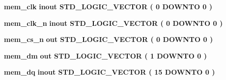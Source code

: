 \begin{DoxyCompactItemize}
\item 
{\bf mem\+\_\+clk}  {\bfseries {\bfseries \textcolor{keywordflow}{inout}\textcolor{vhdlchar}{ }}} {\bfseries \textcolor{comment}{S\+T\+D\+\_\+\+L\+O\+G\+I\+C\+\_\+\+V\+E\+C\+T\+OR}\textcolor{vhdlchar}{ }\textcolor{vhdlchar}{(}\textcolor{vhdlchar}{ }\textcolor{vhdlchar}{ } \textcolor{vhdldigit}{0} \textcolor{vhdlchar}{ }\textcolor{keywordflow}{D\+O\+W\+N\+TO}\textcolor{vhdlchar}{ }\textcolor{vhdlchar}{ } \textcolor{vhdldigit}{0} \textcolor{vhdlchar}{ }\textcolor{vhdlchar}{)}\textcolor{vhdlchar}{ }} 
\item 
{\bf mem\+\_\+clk\+\_\+n}  {\bfseries {\bfseries \textcolor{keywordflow}{inout}\textcolor{vhdlchar}{ }}} {\bfseries \textcolor{comment}{S\+T\+D\+\_\+\+L\+O\+G\+I\+C\+\_\+\+V\+E\+C\+T\+OR}\textcolor{vhdlchar}{ }\textcolor{vhdlchar}{(}\textcolor{vhdlchar}{ }\textcolor{vhdlchar}{ } \textcolor{vhdldigit}{0} \textcolor{vhdlchar}{ }\textcolor{keywordflow}{D\+O\+W\+N\+TO}\textcolor{vhdlchar}{ }\textcolor{vhdlchar}{ } \textcolor{vhdldigit}{0} \textcolor{vhdlchar}{ }\textcolor{vhdlchar}{)}\textcolor{vhdlchar}{ }} 
\item 
{\bf mem\+\_\+cs\+\_\+n}  {\bfseries {\bfseries \textcolor{keywordflow}{out}\textcolor{vhdlchar}{ }}} {\bfseries \textcolor{comment}{S\+T\+D\+\_\+\+L\+O\+G\+I\+C\+\_\+\+V\+E\+C\+T\+OR}\textcolor{vhdlchar}{ }\textcolor{vhdlchar}{(}\textcolor{vhdlchar}{ }\textcolor{vhdlchar}{ } \textcolor{vhdldigit}{0} \textcolor{vhdlchar}{ }\textcolor{keywordflow}{D\+O\+W\+N\+TO}\textcolor{vhdlchar}{ }\textcolor{vhdlchar}{ } \textcolor{vhdldigit}{0} \textcolor{vhdlchar}{ }\textcolor{vhdlchar}{)}\textcolor{vhdlchar}{ }} 
\item 
{\bf mem\+\_\+dm}  {\bfseries {\bfseries \textcolor{keywordflow}{out}\textcolor{vhdlchar}{ }}} {\bfseries \textcolor{comment}{S\+T\+D\+\_\+\+L\+O\+G\+I\+C\+\_\+\+V\+E\+C\+T\+OR}\textcolor{vhdlchar}{ }\textcolor{vhdlchar}{(}\textcolor{vhdlchar}{ }\textcolor{vhdlchar}{ } \textcolor{vhdldigit}{1} \textcolor{vhdlchar}{ }\textcolor{keywordflow}{D\+O\+W\+N\+TO}\textcolor{vhdlchar}{ }\textcolor{vhdlchar}{ } \textcolor{vhdldigit}{0} \textcolor{vhdlchar}{ }\textcolor{vhdlchar}{)}\textcolor{vhdlchar}{ }} 
\item 
{\bf mem\+\_\+dq}  {\bfseries {\bfseries \textcolor{keywordflow}{inout}\textcolor{vhdlchar}{ }}} {\bfseries \textcolor{comment}{S\+T\+D\+\_\+\+L\+O\+G\+I\+C\+\_\+\+V\+E\+C\+T\+OR}\textcolor{vhdlchar}{ }\textcolor{vhdlchar}{(}\textcolor{vhdlchar}{ }\textcolor{vhdlchar}{ } \textcolor{vhdldigit}{15} \textcolor{vhdlchar}{ }\textcolor{keywordflow}{D\+O\+W\+N\+TO}\textcolor{vhdlchar}{ }\textcolor{vhdlchar}{ } \textcolor{vhdldigit}{0} \textcolor{vhdlchar}{ }\textcolor{vhdlchar}{)}\textcolor{vhdlchar}{ }} 

\end{DoxyCompactItemize}
